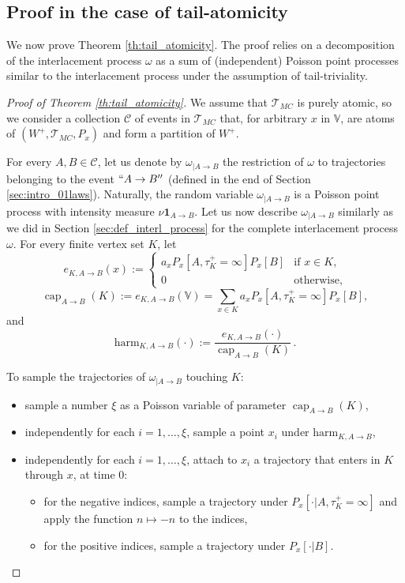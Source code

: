 \documentclass[12pt,a4paper]{article}
\newcommand{\1}[1]{{\mathbf 1}{\{#1\}}}
\newcommand{\8}{{\infty}}
\newcommand{\ind}{{\mathbf{1}}} %
\newcommand{\capa}{\mathop{\mathrm{cap}}}
\newcommand{\harm}{\textrm{harm}}
\begin{document}
\subsection{Proof in the case of tail-atomicity}\label{sec:proof_tail_atomicity}


We now prove Theorem \ref{th:tail_atomicity}. The proof relies on a decomposition of the interlacement process $\omega$ as a sum of (independent) Poisson point processes similar to the interlacement process under the assumption of tail-triviality. 

\begin{proof}[Proof of Theorem \ref{th:tail_atomicity}]
We assume that $\mathcal{T}_{MC}$ is purely atomic, so we consider a collection $\mathcal{C}$ of events in $\mathcal{T}_{MC}$ that, for arbitrary $x$ in $\mathbb{V}$, are atoms of $(W^+, \mathcal{T}_{MC}, P_x)$ and form a partition of $W^+$. 

For every $A, B \in \mathcal{C}$, let us denote by $\omega_{|A\to B}$ the restriction of $\omega$ to trajectories belonging to the event $``A\to B''$ (defined in the end of Section \ref{sec:intro_01laws}). 
Naturally, the random variable $\omega_{|A\to B}$ is a Poisson point process with intensity measure $\nu \ind_{A\to B}$. 
Let us now describe $\omega_{|A\to B}$ similarly as we did in Section \ref{sec:def_interl_process} for the complete interlacement process $\omega$. 
For every finite vertex set $K$, let
\begin{equation}
  e_{K, A\to B}(x):=
  \begin{cases}
    a_x P_x[A, \tau_K^+=\infty]  P_x[B] & \text{if } x\in  K,\\ 
    0 & \text{otherwise},
  \end{cases}
\end{equation}
\begin{equation}
  {\capa}_{A\to B}(K):=e_{K, A\to B}(\mathbb{V})= \sum_{x\in K} a_x P_x[A, \tau_K^+=\infty]  P_x[B],
\end{equation}
and
\begin{equation}
  \harm_{K, A\to B}(\cdot):= \frac{e_{K, A\to B}(\cdot)}{{\capa}_{A\to B}(K)}\, .
\end{equation}

To sample the trajectories of $\omega_{|A\to B}$ touching $K$:
\begin{itemize}
\item sample a number $\xi$ as a Poisson variable of parameter $\capa_{A\to B}(K)$,
\item independently for each $i=1,  \dots, \xi$, sample a point $x_i$ under $\harm_{K, A\to B}$,
\item independently for each $i=1, \dots, \xi$, attach to $x_i$ a trajectory that enters in $K$ through $x$, at time 0:
\begin{itemize}
  \item for the negative indices, sample a trajectory under $P_x[ \cdot |A, \tau_K^+=\infty]$ and apply the function $n\mapsto -n$ to the indices,
  \item for the positive indices, sample a trajectory under $P_x[ \cdot |B ]$.
\end{itemize}
\end{itemize}


\end{proof}
\end{document}
